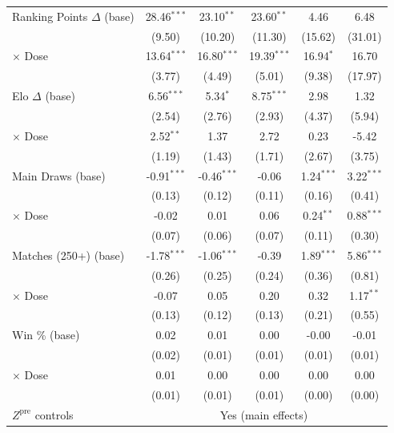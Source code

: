 \begin{tabular}{lccccc}
\quad Ranking Points $\Delta$ (base) & 28.46$^{***}$ & 23.10$^{**}$ & 23.60$^{**}$ & 4.46 & 6.48 \\
 & (9.50) & (10.20) & (11.30) & (15.62) & (31.01) \\
\quad \quad $\times$ Dose & 13.64$^{***}$ & 16.80$^{***}$ & 19.39$^{***}$ & 16.94$^{*}$ & 16.70 \\
 & (3.77) & (4.49) & (5.01) & (9.38) & (17.97) \\[0.3em]
\quad Elo $\Delta$ (base) & 6.56$^{***}$ & 5.34$^{*}$ & 8.75$^{***}$ & 2.98 & 1.32 \\
 & (2.54) & (2.76) & (2.93) & (4.37) & (5.94) \\
\quad \quad $\times$ Dose & 2.52$^{**}$ & 1.37 & 2.72 & 0.23 & -5.42 \\
 & (1.19) & (1.43) & (1.71) & (2.67) & (3.75) \\[0.3em]
\quad Main Draws (base) & -0.91$^{***}$ & -0.46$^{***}$ & -0.06 & 1.24$^{***}$ & 3.22$^{***}$ \\
 & (0.13) & (0.12) & (0.11) & (0.16) & (0.41) \\
\quad \quad $\times$ Dose & -0.02 & 0.01 & 0.06 & 0.24$^{**}$ & 0.88$^{***}$ \\
 & (0.07) & (0.06) & (0.07) & (0.11) & (0.30) \\[0.3em]
\quad Matches (250+) (base) & -1.78$^{***}$ & -1.06$^{***}$ & -0.39 & 1.89$^{***}$ & 5.86$^{***}$ \\
 & (0.26) & (0.25) & (0.24) & (0.36) & (0.81) \\
\quad \quad $\times$ Dose & -0.07 & 0.05 & 0.20 & 0.32 & 1.17$^{**}$ \\
 & (0.13) & (0.12) & (0.13) & (0.21) & (0.55) \\[0.3em]
\quad Win \% (base) & 0.02 & 0.01 & 0.00 & -0.00 & -0.01 \\
 & (0.02) & (0.01) & (0.01) & (0.01) & (0.01) \\
\quad \quad $\times$ Dose & 0.01 & 0.00 & 0.00 & 0.00 & 0.00 \\
 & (0.01) & (0.01) & (0.01) & (0.00) & (0.00) \\[0.3em]
\midrule
$Z^{\text{pre}}$ controls & \multicolumn{5}{c}{Yes (main effects)} \\
\bottomrule
\end{tabular}

